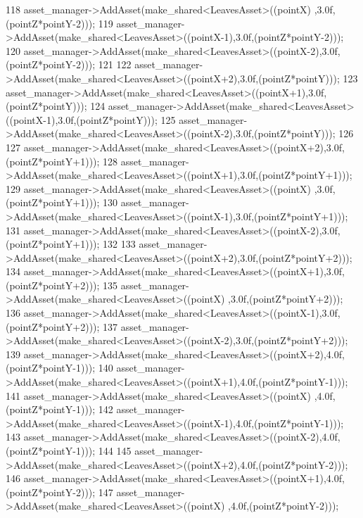 \begin{DoxyCode}
118             asset\_manager->AddAsset(make\_shared<LeavesAsset>((pointX)  ,3.0f,(pointZ*pointY-2)));
119             asset\_manager->AddAsset(make\_shared<LeavesAsset>((pointX-1),3.0f,(pointZ*pointY-2)));
120             asset\_manager->AddAsset(make\_shared<LeavesAsset>((pointX-2),3.0f,(pointZ*pointY-2)));
121 
122             asset\_manager->AddAsset(make\_shared<LeavesAsset>((pointX+2),3.0f,(pointZ*pointY)));
123             asset\_manager->AddAsset(make\_shared<LeavesAsset>((pointX+1),3.0f,(pointZ*pointY)));
124             asset\_manager->AddAsset(make\_shared<LeavesAsset>((pointX-1),3.0f,(pointZ*pointY)));
125             asset\_manager->AddAsset(make\_shared<LeavesAsset>((pointX-2),3.0f,(pointZ*pointY))); 
126 
127             asset\_manager->AddAsset(make\_shared<LeavesAsset>((pointX+2),3.0f,(pointZ*pointY+1)));
128             asset\_manager->AddAsset(make\_shared<LeavesAsset>((pointX+1),3.0f,(pointZ*pointY+1)));
129             asset\_manager->AddAsset(make\_shared<LeavesAsset>((pointX)  ,3.0f,(pointZ*pointY+1)));
130             asset\_manager->AddAsset(make\_shared<LeavesAsset>((pointX-1),3.0f,(pointZ*pointY+1)));
131             asset\_manager->AddAsset(make\_shared<LeavesAsset>((pointX-2),3.0f,(pointZ*pointY+1)));
132  
133             asset\_manager->AddAsset(make\_shared<LeavesAsset>((pointX+2),3.0f,(pointZ*pointY+2)));
134             asset\_manager->AddAsset(make\_shared<LeavesAsset>((pointX+1),3.0f,(pointZ*pointY+2)));
135             asset\_manager->AddAsset(make\_shared<LeavesAsset>((pointX)  ,3.0f,(pointZ*pointY+2)));
136             asset\_manager->AddAsset(make\_shared<LeavesAsset>((pointX-1),3.0f,(pointZ*pointY+2)));
137             asset\_manager->AddAsset(make\_shared<LeavesAsset>((pointX-2),3.0f,(pointZ*pointY+2)));
139             asset\_manager->AddAsset(make\_shared<LeavesAsset>((pointX+2),4.0f,(pointZ*pointY-1)));
140             asset\_manager->AddAsset(make\_shared<LeavesAsset>((pointX+1),4.0f,(pointZ*pointY-1)));
141             asset\_manager->AddAsset(make\_shared<LeavesAsset>((pointX)  ,4.0f,(pointZ*pointY-1)));
142             asset\_manager->AddAsset(make\_shared<LeavesAsset>((pointX-1),4.0f,(pointZ*pointY-1)));
143             asset\_manager->AddAsset(make\_shared<LeavesAsset>((pointX-2),4.0f,(pointZ*pointY-1)));
144  
145             asset\_manager->AddAsset(make\_shared<LeavesAsset>((pointX+2),4.0f,(pointZ*pointY-2)));
146             asset\_manager->AddAsset(make\_shared<LeavesAsset>((pointX+1),4.0f,(pointZ*pointY-2)));
147             asset\_manager->AddAsset(make\_shared<LeavesAsset>((pointX)  ,4.0f,(pointZ*pointY-2)));

\end{DoxyCode}

